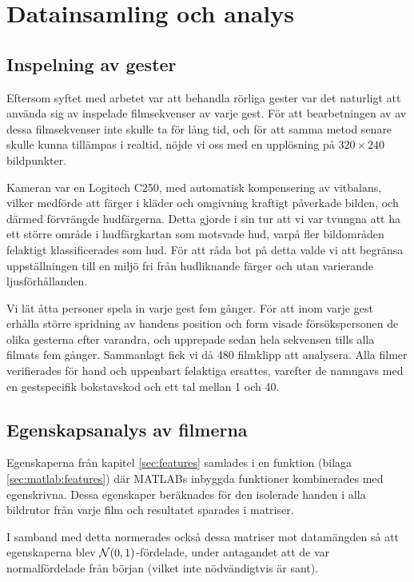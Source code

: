 \documentclass[../rapport_MVEX01-11-05]{subfiles}
\begin{document}
\section{Datainsamling och analys}

\subsection{Inspelning av gester}
Eftersom syftet med arbetet var att behandla rörliga
gester var det naturligt att 
använda sig av inspelade filmsekvenser av varje gest.
För att bearbetningen av av dessa filmsekvenser inte skulle ta för lång tid,
och för att samma metod senare skulle kunna tillämpas i realtid,
nöjde vi oss med en upplösning på $320\times240$ bildpunkter.

Kameran var en Logitech C250, med automatisk kompensering av vitbalans,
vilker medförde att färger i kläder och omgivning kraftigt påverkade bilden,
och därmed förvrängde hudfärgerna. Detta gjorde i sin tur att vi var
tvungna att ha ett större område i hudfärgkartan
som motsvade hud, varpå fler bildområden felaktigt klassificerades som hud.
För att råda
bot på detta valde vi att begränsa uppställningen till en miljö fri från
hudliknande färger och utan varierande ljusförhållanden.

Vi lät åtta personer spela in varje gest fem gånger.
För att inom varje gest erhålla större spridning av handens position och form
visade försökspersonen de olika gesterna efter varandra, och upprepade sedan
hela sekvensen tills alla filmats fem gånger. Sammanlagt fick vi då 480
filmklipp att analysera.
Alla filmer verifierades för hand och uppenbart felaktiga ersattes, varefter
de namngavs med en gestspecifik bokstavskod och ett tal mellan 1 och 40.

\subsection{Egenskapsanalys av filmerna}
Egenskaperna från kapitel \ref{sec:features} samlades i en funktion
(bilaga \ref{sec:matlab:features}) där MATLABs inbyggda funktioner kombinerades
med egenskrivna.
Dessa egenskaper beräknades
för den isolerade handen i alla bildrutor från varje film och resultatet
sparades i matriser.

I samband med detta normerades också dessa
matriser mot datamängden så att egenskaperna blev $\mathcal{N}(0,1)$-fördelade,
under antagandet att de var normalfördelade från början (vilket inte
nödvändigtvis är sant).
\end{document}

